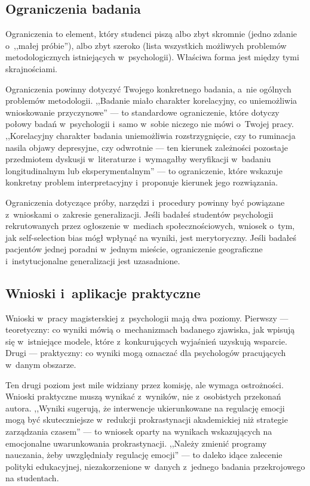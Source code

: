 \documentclass[12pt,a4paper,twoside,openany]{book}
\begin{document}
\subsection{Ograniczenia badania}

Ograniczenia to element, który studenci piszą albo zbyt skromnie (jedno zdanie o~,,małej próbie''), albo zbyt szeroko (lista wszystkich możliwych problemów metodologicznych istniejących w~psychologii). Właściwa forma jest między tymi skrajnościami.

Ograniczenia powinny dotyczyć Twojego konkretnego badania, a~nie ogólnych problemów metodologii. ,,Badanie miało charakter korelacyjny, co uniemożliwia wnioskowanie przyczynowe'' --- to standardowe ograniczenie, które dotyczy połowy badań w~psychologii i~samo w~sobie niczego nie mówi o~Twojej pracy. ,,Korelacyjny charakter badania uniemożliwia rozstrzygnięcie, czy to ruminacja nasila objawy depresyjne, czy odwrotnie --- ten kierunek zależności pozostaje przedmiotem dyskusji w~literaturze i~wymagałby weryfikacji w~badaniu longitudinalnym lub eksperymentalnym'' --- to ograniczenie, które wskazuje konkretny problem interpretacyjny i~proponuje kierunek jego rozwiązania.

Ograniczenia dotyczące próby, narzędzi i~procedury powinny być powiązane z~wnioskami o~zakresie generalizacji. Jeśli badałeś studentów psychologii rekrutowanych przez ogłoszenie w~mediach społecznościowych, wniosek o~tym, jak self-selection bias mógł wpłynąć na wyniki, jest merytoryczny. Jeśli badałeś pacjentów jednej poradni w~jednym mieście, ograniczenie geograficzne i~instytucjonalne generalizacji jest uzasadnione.

\subsection{Wnioski i~aplikacje praktyczne}

Wnioski w~pracy magisterskiej z~psychologii mają dwa poziomy. Pierwszy --- teoretyczny: co wyniki mówią o~mechanizmach badanego zjawiska, jak wpisują się w~istniejące modele, które z~konkurujących wyjaśnień uzyskują wsparcie. Drugi --- praktyczny: co wyniki mogą oznaczać dla psychologów pracujących w~danym obszarze.

Ten drugi poziom jest mile widziany przez komisję, ale wymaga ostrożności. Wnioski praktyczne muszą wynikać z~wyników, nie z~osobistych przekonań autora. ,,Wyniki sugerują, że interwencje ukierunkowane na regulację emocji mogą być skuteczniejsze w~redukcji prokrastynacji akademickiej niż strategie zarządzania czasem'' --- to wniosek oparty na wynikach wskazujących na emocjonalne uwarunkowania prokrastynacji. ,,Należy zmienić programy nauczania, żeby uwzględniały regulację emocji'' --- to daleko idące zalecenie polityki edukacyjnej, niezakorzenione w~danych z~jednego badania przekrojowego na studentach.
\end{document}
